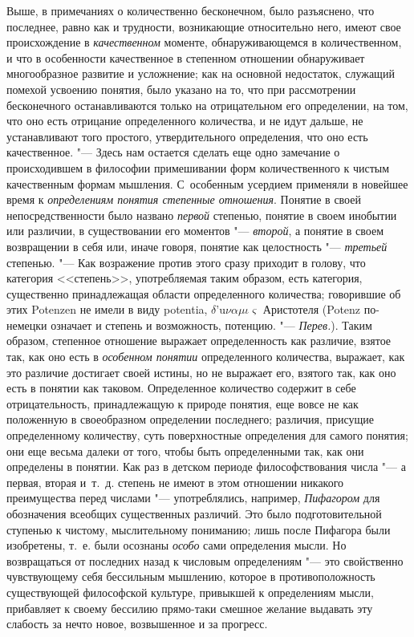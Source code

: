 Выше, в примечаниях о количественно бесконечном, было разъяснено, что
последнее, равно как и трудности, возникающие относительно него, имеют свое
происхождение в {\em качественном} моменте,
обнаруживающемся в количественном, и что в особенности качественное в
степенном отношении обнаруживает многообразное развитие и усложнение; как
на основной недостаток, служащий помехой усвоению понятия, было указано на
то, что при рассмотрении бесконечного останавливаются только на
отрицательном его определении, на том, что оно есть отрицание определенного
количества, и не идут дальше, не устанавливают того простого,
утвердительного определения, что оно есть качественное. "--- Здесь нам
остается сделать еще одно замечание о происходившем в философии
примешивании форм количественного к чистым качественным формам мышления.
С~особенным усердием применяли в новейшее время к
{\em определениям понятия степенные
отношения}.
Понятие в своей непосредственности было названо
{\em первой} степенью, понятие в своем инобытии или
различии, в существовании его моментов "--- {\em второй},
а понятие в своем возвращении в себя или, иначе говоря, понятие как
целостность "--- {\em третьей} степенью. "--- Как возражение
против этого сразу приходит в голову, что категория <<степень>>,
употребляемая таким образом, есть категория, существенно принадлежащая
области определенного количества; говорившие об этих Potenzen не имели в
виду potentia, $\delta \text{'u} \nu \alpha \mu \iota \varsigma
$ Аристотеля (Potenz по-немецки означает и степень и возможность, потенцию.
"--- {\em Перев.}). Таким образом, степенное отношение выражает
определенность как различие, взятое так, как оно есть в
{\em особенном понятии} определенного количества,
выражает, как это различие достигает своей истины, но не выражает его,
взятого так, как оно есть в понятии как таковом. Определенное количество
содержит в себе отрицательность, принадлежащую к природе понятия, еще вовсе
не как положенную в своеобразном определении последнего; различия, присущие
определенному количеству, суть поверхностные определения для самого
понятия; они еще весьма далеки от того, чтобы быть определенными так, как
они определены в понятии. Как раз в детском периоде философствования числа
"--- а первая, вторая и~т.~д. степень не имеют в этом отношении никакого
преимущества перед числами "--- употреблялись, например,
{\em Пифагором} для обозначения всеобщих существенных
различий. Это было подготовительной ступенью к чистому, мыслительному
пониманию; лишь после Пифагора были изобретены, т.~е. были осознаны
{\em особо} сами определения мысли. Но возвращаться от
последних назад к числовым определениям "--- это свойственно чувствующему себя
бессильным мышлению, которое в противоположность существующей философской
культуре, привыкшей к определениям мысли, прибавляет к своему бессилию
прямо-таки смешное желание выдавать эту слабость за нечто новое,
возвышенное и за прогресс.

